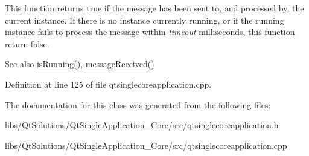 This function returns true if the message has been sent to, and processed by, the current instance. If there is no instance currently running, or if the running instance fails to process the message within {\itshape timeout} milliseconds, this function return false.

\begin{DoxySeeAlso}{See also}
\hyperlink{class_qt_single_core_application_a419bfb7b02f0459f4d207d448bc6c876}{is\+Running()}, \hyperlink{class_qt_single_core_application_a1af66a1770ff5eec8006a26a2ce42ca1}{message\+Received()} 
\end{DoxySeeAlso}


Definition at line 125 of file qtsinglecoreapplication.\+cpp.



The documentation for this class was generated from the following files\+:\begin{DoxyCompactItemize}
\item 
libs/\+Qt\+Solutions/\+Qt\+Single\+Application\+\_\+\+Core/src/qtsinglecoreapplication.\+h\item 
libs/\+Qt\+Solutions/\+Qt\+Single\+Application\+\_\+\+Core/src/qtsinglecoreapplication.\+cpp\end{DoxyCompactItemize}
